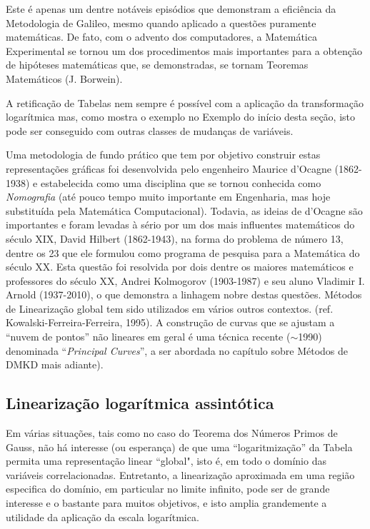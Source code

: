     Este é apenas um dentre notáveis episódios que demonstram a eficiência da Metodologia de Galileo, mesmo quando aplicado a questões puramente matemáticas. De fato, com o advento dos computadores, a Matemática Experimental se tornou um dos procedimentos mais importantes para a obtenção de hipóteses matemáticas que, se demonstradas, se tornam Teoremas Matemáticos (J. Borwein).

    A retificação de Tabelas nem sempre é possível com a aplicação da transformação logarítmica mas, como mostra o exemplo no Exemplo do início desta seção, isto pode ser conseguido com outras classes de mudanças de variáveis.
    
    Uma metodologia de fundo prático que tem por objetivo construir estas representações gráficas foi desenvolvida pelo engenheiro Maurice d'Ocagne (1862-1938) e estabelecida como uma disciplina que se tornou conhecida como \textit{Nomografia} (até pouco tempo muito importante em Engenharia, mas hoje substituída pela Matemática Computacional). Todavia, as ideias de d'Ocagne são importantes e foram levadas à sério por um dos mais influentes matemáticos do século XIX, David Hilbert (1862-1943), na forma do problema de número 13, dentre os 23 que ele formulou como programa de pesquisa para a Matemática do século XX. Esta questão foi resolvida por dois dentre os maiores matemáticos e professores do século XX, Andrei Kolmogorov (1903-1987) e seu aluno Vladimir I. Arnold (1937-2010), o que demonstra a linhagem nobre destas questões. Métodos de Linearização global tem sido utilizados em vários outros contextos. (ref. Kowalski-Ferreira-Ferreira, 1995). A construção de curvas que se ajustam a ``nuvem de pontos'' não lineares em geral é uma técnica recente (\(\sim\)1990) denominada ``\textit{Principal Curves}'', a ser abordada no capítulo sobre Métodos de DMKD mais adiante).

\subsection{Linearização logarítmica assintótica}

    Em várias situações, tais como no caso do Teorema dos Números Primos de Gauss, não há interesse (ou esperança) de que uma ``logaritmização'' da Tabela permita uma representação linear ``global", isto é, em todo o domínio das variáveis correlacionadas. Entretanto, a linearização aproximada em uma região especifica do domínio, em particular no limite infinito, pode ser de grande interesse e o bastante para muitos objetivos, e isto amplia grandemente a utilidade da aplicação da escala logarítmica.

